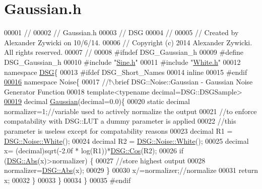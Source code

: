 \hypertarget{_gaussian_8h_source}{\section{Gaussian.\+h}
\label{_gaussian_8h_source}
}

\begin{DoxyCode}
00001 \textcolor{comment}{//}
00002 \textcolor{comment}{//  Gaussian.h}
00003 \textcolor{comment}{//  DSG}
00004 \textcolor{comment}{//}
00005 \textcolor{comment}{//  Created by Alexander Zywicki on 10/6/14.}
00006 \textcolor{comment}{//  Copyright (c) 2014 Alexander Zywicki. All rights reserved.}
00007 \textcolor{comment}{//}
00008 \textcolor{preprocessor}{#ifndef DSG\_Gaussian\_h}
00009 \textcolor{preprocessor}{#define DSG\_Gaussian\_h}
00010 \textcolor{preprocessor}{#include "\hyperlink{_sine_8h}{Sine.h}"}
00011 \textcolor{preprocessor}{#include "\hyperlink{_white_8h}{White.h}"}
00012 \textcolor{keyword}{namespace }\hyperlink{namespace_d_s_g}{DSG}\{
00013 \textcolor{preprocessor}{#ifdef DSG\_Short\_Names}
00014     \textcolor{keyword}{inline}
00015 \textcolor{preprocessor}{#endif}
\hypertarget{_gaussian_8h_source_l00016}{}\hyperlink{namespace_d_s_g_1_1_noise}{00016}     \textcolor{keyword}{namespace }Noise\{\textcolor{comment}{}
00017 \textcolor{comment}{        //!\(\backslash\)brief DSG::Noise::Gaussian - Gaussian Noise Generator Function}
00018 \textcolor{comment}{}        \textcolor{keyword}{template}<\textcolor{keyword}{typename} decimal=DSG::DSGSample>
\hypertarget{_gaussian_8h_source_l00019}{}\hyperlink{namespace_d_s_g_1_1_noise_a87c4bcd92a902d32df1d7f1d5acffcd4}{00019}         decimal \hyperlink{namespace_d_s_g_1_1_noise_a87c4bcd92a902d32df1d7f1d5acffcd4}{Gaussian}(decimal=0.0)\{
00020             \textcolor{keyword}{static} decimal normalizer=1;\textcolor{comment}{//variable used to actively normalize the output}
00021             \textcolor{comment}{//to enforce compatability with DSG::LUT a dummy parameter is applied}
00022             \textcolor{comment}{//this parameter is useless except for compatability reasons}
00023             decimal R1 = \hyperlink{namespace_d_s_g_1_1_noise_a0d1c4b4522d2e56b1aa604e45ab92066}{DSG::Noise::White}();
00024             decimal R2 = \hyperlink{namespace_d_s_g_1_1_noise_a0d1c4b4522d2e56b1aa604e45ab92066}{DSG::Noise::White}();
00025             decimal x= (decimal)sqrt(-2.0f * log(R1))*\hyperlink{namespace_d_s_g_ade303ad15c77f534429305c3cbd90191}{DSG::Cos}(R2);
00026             \textcolor{keywordflow}{if} (\hyperlink{namespace_d_s_g_a0af03bade7e25e8da80e3022af0e45a7}{DSG::Abs}(x)>normalizer) \{
00027                 \textcolor{comment}{//store highest output}
00028                 normalizer=\hyperlink{namespace_d_s_g_a0af03bade7e25e8da80e3022af0e45a7}{DSG::Abs}(x);
00029             \}
00030             x/=normalizer;\textcolor{comment}{//normalize}
00031             \textcolor{keywordflow}{return} x;
00032         \}
00033     \}
00034 \}
00035 \textcolor{preprocessor}{#endif}
\end{DoxyCode}
